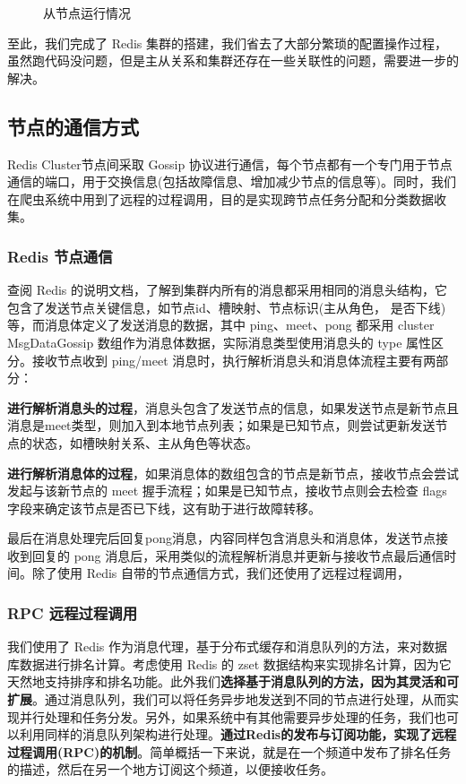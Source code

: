 \documentclass[12pt,hyperref,a4paper,UTF8]{ctexart}
\begin{document}
\begin{figure}[H]
\begin{minipage}{0.495\textwidth}
        \caption{从节点运行情况}  
    \end{minipage}  
\end{figure} 

至此，我们完成了 Redis 集群的搭建，我们省去了大部分繁琐的配置操作过程，虽然跑代码没问题，但是主从关系和集群还存在一些关联性的问题，需要进一步的解决。

\subsection{节点的通信方式}

Redis Cluster节点间采取 Gossip 协议进行通信，每个节点都有一个专门用于节点通信的端口，用于交换信息(包括故障信息、增加减少节点的信息等)。同时，我们在爬虫系统中用到了远程的过程调用，目的是实现跨节点任务分配和分类数据收集。

\subsubsection{Redis 节点通信}

查阅 Redis 的说明文档，了解到集群内所有的消息都采用相同的消息头结构，它包含了发送节点关键信息，如节点id、槽映射、节点标识(主从角色， 是否下线)等，而消息体定义了发送消息的数据，其中 ping、meet、pong 都采用 cluster MsgDataGossip 数组作为消息体数据，实际消息类型使用消息头的 type 属性区分。接收节点收到 ping/meet 消息时，执行解析消息头和消息体流程主要有两部分：

\textbf{进行解析消息头的过程}，消息头包含了发送节点的信息，如果发送节点是新节点且消息是meet类型，则加入到本地节点列表；如果是已知节点，则尝试更新发送节点的状态，如槽映射关系、主从角色等状态。

\textbf{进行解析消息体的过程}，如果消息体的数组包含的节点是新节点，接收节点会尝试发起与该新节点的 meet 握手流程；如果是已知节点，接收节点则会去检查 flags 字段来确定该节点是否已下线，这有助于进行故障转移。

最后在消息处理完后回复pong消息，内容同样包含消息头和消息体，发送节点接收到回复的 pong 消息后，采用类似的流程解析消息并更新与接收节点最后通信时间。除了使用 Redis 自带的节点通信方式，我们还使用了远程过程调用，

\subsubsection{RPC 远程过程调用}

我们使用了 Redis 作为消息代理，基于分布式缓存和消息队列的方法，来对数据库数据进行排名计算。考虑使用 Redis 的 zset 数据结构来实现排名计算，因为它天然地支持排序和排名功能。此外我们\textbf{选择基于消息队列的方法，因为其灵活和可扩展}。通过消息队列，我们可以将任务异步地发送到不同的节点进行处理，从而实现并行处理和任务分发。另外，如果系统中有其他需要异步处理的任务，我们也可以利用同样的消息队列架构进行处理。\textbf{通过Redis的发布与订阅功能，实现了远程过程调用(RPC)的机制}。简单概括一下来说，就是在一个频道中发布了排名任务的描述，然后在另一个地方订阅这个频道，以便接收任务。
\end{document}
